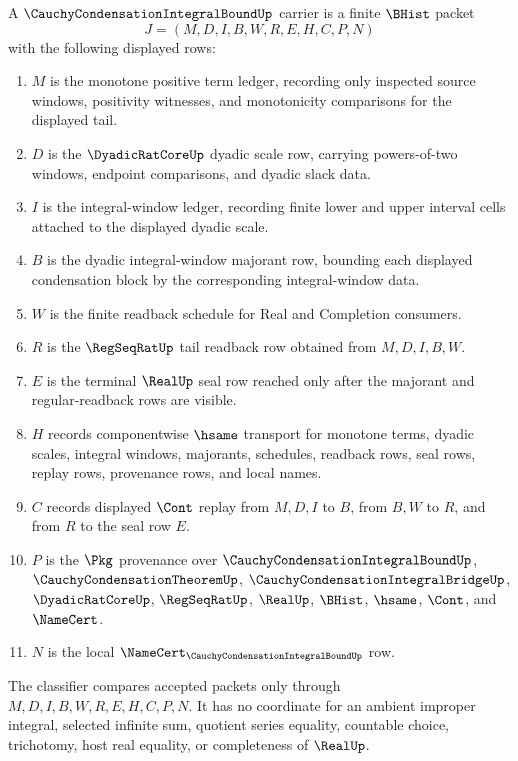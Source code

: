 \begin{definition}
\label{def:cauchy-condensation-integral-bound-carrier}
A $\CauchyCondensationIntegralBoundUp$ carrier is a finite $\BHist$ packet
$$
J=(M,D,I,B,W,R,E,H,C,P,N)
$$
with the following displayed rows:
\begin{enumerate}
\item $M$ is the monotone positive term ledger, recording only inspected source windows, positivity witnesses, and monotonicity comparisons for the displayed tail.
\item $D$ is the $\DyadicRatCoreUp$ dyadic scale row, carrying powers-of-two windows, endpoint comparisons, and dyadic slack data.
\item $I$ is the integral-window ledger, recording finite lower and upper interval cells attached to the displayed dyadic scale.
\item $B$ is the dyadic integral-window majorant row, bounding each displayed condensation block by the corresponding integral-window data.
\item $W$ is the finite readback schedule for Real and Completion consumers.
\item $R$ is the $\RegSeqRatUp$ tail readback row obtained from $M,D,I,B,W$.
\item $E$ is the terminal $\RealUp$ seal row reached only after the majorant and regular-readback rows are visible.
\item $H$ records componentwise $\hsame$ transport for monotone terms, dyadic scales, integral windows, majorants, schedules, readback rows, seal rows, replay rows, provenance rows, and local names.
\item $C$ records displayed $\Cont$ replay from $M,D,I$ to $B$, from $B,W$ to $R$, and from $R$ to the seal row $E$.
\item $P$ is the $\Pkg$ provenance over $\CauchyCondensationIntegralBoundUp$, $\CauchyCondensationTheoremUp$, $\CauchyCondensationIntegralBridgeUp$, $\DyadicRatCoreUp$, $\RegSeqRatUp$, $\RealUp$, $\BHist$, $\hsame$, $\Cont$, and $\NameCert$.
\item $N$ is the local $\NameCert_{\CauchyCondensationIntegralBoundUp}$ row.
\end{enumerate}
The classifier compares accepted packets only through $M,D,I,B,W,R,E,H,C,P,N$. It has no coordinate for an ambient improper integral, selected infinite sum, quotient series equality, countable choice, trichotomy, host real equality, or completeness of $\RealUp$.
\end{definition}

